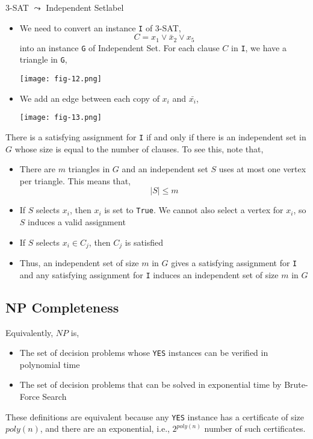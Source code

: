 	\begin{ex}{3-SAT $\leadsto$ Independent Set}{label}
		\begin{itemize}
			\item We need to convert an instance \texttt{I} of 3-SAT,
			\[C=x_{1} \vee \bar{x}_{2} \vee x_{5}\]
			\noindent into an instance \texttt{G} of Independent Set. For each clause $C$ in \texttt{I}, we have a triangle in \texttt{G},

			\texttt{[image: fig-12.png]}

			\item We add an edge between each copy of $x_i$ and $\bar{x_i}$,

			\texttt{[image: fig-13.png]}
		\end{itemize}
		There is a satisfying assignment for \texttt{I} if and only if there is an independent set in $G$ whose size is equal to the number of clauses. To see this, note that,
		\begin{itemize}
			\item There are $m$ triangles in $G$ and an independent set $S$ uses at most one vertex per triangle. This means that,
			\[|S| \leq m\]
			\item If $S$ selects $x_i$, then $x_i$ is set to \texttt{True}. We cannot also select a vertex for $x_i$, so $S$ induces a valid assignment
			\item If $S$ selects $x_i \in C_j$, then $C_j$ is satisfied
			\item Thus, an independent set of size $m$ in $G$ gives a satisfying assignment for \texttt{I} and any satisfying assignment for \texttt{I} induces an independent set of size $m$ in $G$ 
		\end{itemize}
 	\end{ex}

 	\subsection{NP Completeness}
 	\begin{marginfigure}
 		Equivalently, $NP$ is,
 		\begin{itemize}
 			\item The set of decision problems whose \texttt{YES} instances can be verified in polynomial time
 			\item The set of decision problems that can be solved in exponential time by Brute-Force Search
 		\end{itemize}
 		\noindent These definitions are equivalent because any \texttt{YES} instance has a certificate of size $poly(n)$, and there are an exponential, i.e., $2^{poly(n)}$ number of such certificates.
 	\end{marginfigure}

